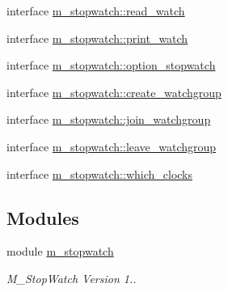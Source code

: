 \begin{DoxyCompactItemize}
\item 
interface \hyperlink{interfacem__stopwatch_1_1read__watch}{m\+\_\+stopwatch\+::read\+\_\+watch}
\item 
interface \hyperlink{interfacem__stopwatch_1_1print__watch}{m\+\_\+stopwatch\+::print\+\_\+watch}
\item 
interface \hyperlink{interfacem__stopwatch_1_1option__stopwatch}{m\+\_\+stopwatch\+::option\+\_\+stopwatch}
\item 
interface \hyperlink{interfacem__stopwatch_1_1create__watchgroup}{m\+\_\+stopwatch\+::create\+\_\+watchgroup}
\item 
interface \hyperlink{interfacem__stopwatch_1_1join__watchgroup}{m\+\_\+stopwatch\+::join\+\_\+watchgroup}
\item 
interface \hyperlink{interfacem__stopwatch_1_1leave__watchgroup}{m\+\_\+stopwatch\+::leave\+\_\+watchgroup}
\item 
interface \hyperlink{interfacem__stopwatch_1_1which__clocks}{m\+\_\+stopwatch\+::which\+\_\+clocks}
\end{DoxyCompactItemize}
\subsection*{Modules}
\begin{DoxyCompactItemize}
\item 
module \hyperlink{namespacem__stopwatch}{m\+\_\+stopwatch}
\begin{DoxyCompactList}\small\item\em M\+\_\+\+Stop\+Watch Version 1.. \end{DoxyCompactList}\end{DoxyCompactItemize}
